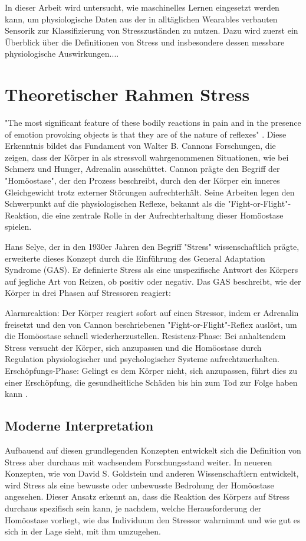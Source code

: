 In dieser Arbeit wird untersucht, wie maschinelles Lernen eingesetzt werden kann, um physiologische Daten aus der in alltäglichen Wearables verbauten Sensorik zur Klassifizierung
von Stresszuständen zu nutzen. Dazu wird zuerst ein Überblick über die Definitionen von Stress und insbesondere dessen messbare physiologische Auswirkungen....

\section{Theoretischer Rahmen Stress}
"The most significant feature of these bodily reactions in pain and in the presence of emotion provoking objects is that they are of the nature of reflexes" \cite{Cannon1915}. 
Diese Erkenntnis bildet das Fundament von Walter B. Cannons Forschungen, die zeigen, dass der Körper in als stressvoll wahrgenommenen Situationen, wie bei Schmerz und Hunger, 
Adrenalin ausschüttet. Cannon prägte den Begriff der "Homöostase", der den Prozess beschreibt, durch den der Körper ein inneres Gleichgewicht trotz externer Störungen aufrechterhält. 
Seine Arbeiten legen den Schwerpunkt auf die physiologischen Reflexe, bekannt als die "Fight-or-Flight"-Reaktion, die eine zentrale Rolle in der Aufrechterhaltung dieser Homöostase spielen.

Hans Selye, der in den 1930er Jahren den Begriff "Stress" wissenschaftlich prägte, erweiterte dieses Konzept durch die Einführung des General Adaptation Syndrome (GAS). Er definierte Stress als eine unspezifische Antwort des 
Körpers auf jegliche Art von Reizen, ob positiv oder negativ. Das GAS beschreibt, wie der Körper in drei Phasen auf Stressoren reagiert:

Alarmreaktion: Der Körper reagiert sofort auf einen Stressor, indem er Adrenalin freisetzt und den von Cannon beschriebenen "Fight-or-Flight"-Reflex auslöst, um die 
Homöostase schnell wiederherzustellen.
Resistenz-Phase: Bei anhaltendem Stress versucht der Körper, sich anzupassen und die Homöostase durch Regulation physiologischer und psychologischer 
Systeme aufrechtzuerhalten.
Erschöpfungs-Phase: Gelingt es dem Körper nicht, sich anzupassen, führt dies zu einer Erschöpfung, die gesundheitliche Schäden bis hin zum Tod zur Folge 
haben kann \cite{Selye1936}.

\subsection{Moderne Interpretation}

Aufbauend auf diesen grundlegenden Konzepten entwickelt sich die Definition von Stress aber durchaus mit wachsendem Forschungsstand weiter. 
In neueren Konzepten, wie von David S. Goldstein und anderen Wissenschaftlern entwickelt, wird Stress als eine bewusste oder unbewusste Bedrohung der 
Homöostase angesehen. Dieser Ansatz erkennt an, dass die Reaktion des Körpers auf Stress durchaus spezifisch sein kann, je nachdem, welche Herausforderung 
der Homöostase vorliegt, wie das Individuum den Stressor wahrnimmt und wie gut es sich in der Lage sieht, mit ihm umzugehen.

